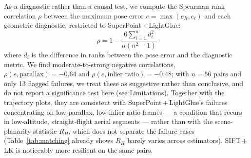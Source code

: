 \documentclass[11pt,a4paper]{article}
\begin{document}
As a diagnostic rather than a causal test, we compute the Spearman
rank correlation $\rho$ between the maximum pose error
$e = \max(e_R, e_t)$ and each geometric diagnostic, restricted to
SuperPoint\,+\,LightGlue:
\begin{equation}
\rho = 1 - \frac{6 \sum_{i=1}^{n} d_i^2}{n(n^2 - 1)}
\end{equation}
where $d_i$ is the difference in ranks between the pose error and the
diagnostic metric. We find moderate-to-strong negative correlations,
$\rho(e, \text{parallax}) = -0.64$ and $\rho(e, \text{inlier\_ratio}) =
-0.48$; with $n = 56$ pairs and only 13 flagged failures, we treat
these as suggestive rather than conclusive, and do not report a
significance test here (see Limitations). Together with the
trajectory plots, they are consistent with SuperPoint\,+\,LightGlue's
failures concentrating on low-parallax, low-inlier-ratio frames --- a
condition that recurs in low-altitude, straight-flight aerial
segments --- rather than with the scene-planarity statistic $R_H$,
which does not separate the failure cases (Table~\ref{tab:matching}
already shows $R_H$ barely varies across estimators). SIFT\,+\,LK is
noticeably more resilient on the same pairs.

\end{document}
